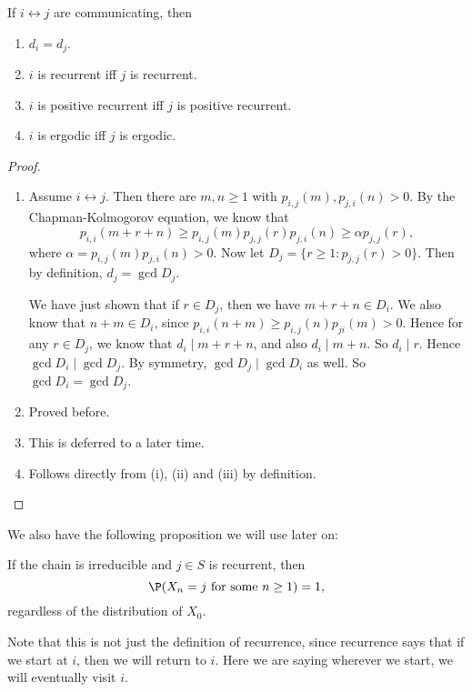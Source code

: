 \documentclass[a4paper]{article}
\begin{document}
\begin{thm}
  If $i \leftrightarrow j$ are communicating, then
  \begin{enumerate}
    \item $d_i = d_j$.
    \item $i$ is recurrent iff $j$ is recurrent.
    \item $i$ is positive recurrent iff $j$ is positive recurrent.
    \item $i$ is ergodic iff $j$ is ergodic.
  \end{enumerate}
\end{thm}

\begin{proof}\leavevmode
  \begin{enumerate}
    \item Assume $i \leftrightarrow j$. Then there are $m, n \geq 1$ with $p_{i, j}(m), p_{j, i}(n) > 0$. By the Chapman-Kolmogorov equation, we know that
      \[
        p_{i, i}(m + r + n) \geq p_{i, j}(m)p_{j, j}(r)p_{j, i}(n) \geq \alpha p_{j, j}(r),
      \]
      where $\alpha = p_{i, j}(m) p_{j, i}(n) > 0$. Now let $D_j = \{r \geq 1: p_{j, j}(r) > 0\}$. Then by definition, $d_j = \gcd D_j$.

      We have just shown that if $r \in D_j$, then we have $m + r + n \in D_i$. We also know that $n + m \in D_i$, since $p_{i, i}(n + m) \geq p_{i, j}(n)p_{ji}(m) > 0$. Hence for any $r \in D_j$, we know that $d_i \mid m + r + n$, and also $d_i \mid m + n$. So $d_i \mid r$. Hence $\gcd D_i \mid \gcd D_j$. By symmetry, $\gcd D_j \mid \gcd D_i$ as well. So $\gcd D_i = \gcd D_j$.
    \item Proved before.
    \item This is deferred to a later time.
    \item Follows directly from (i), (ii) and (iii) by definition.\qedhere
  \end{enumerate}
\end{proof}

We also have the following proposition we will use later on:
\begin{prop}
  If the chain is irreducible and $j \in S$ is recurrent, then
  \[
    \P(X_n = j\text{ for some }n \geq 1) = 1,
  \]
  regardless of the distribution of $X_0$.
\end{prop}
Note that this is not just the definition of recurrence, since recurrence says that if we start at $i$, then we will return to $i$. Here we are saying wherever we start, we will eventually visit $i$.
\end{document}
